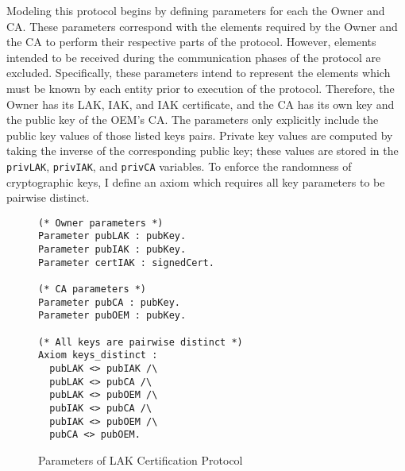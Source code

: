 Modeling this protocol begins by defining parameters for each the Owner and CA. These parameters correspond with the elements required by the Owner and the CA to perform their respective parts of the protocol. However, elements intended to be received during the communication phases of the protocol are excluded. Specifically, these parameters intend to represent the elements which must be known by each entity prior to execution of the protocol. Therefore, the Owner has its LAK, IAK, and IAK certificate, and the CA has its own key and the public key of the OEM's CA. The parameters only explicitly include the public key values of those listed keys pairs. Private key values are computed by taking the inverse of the corresponding public key; these values are stored in the \verb|privLAK|, \verb|privIAK|, and \verb|privCA| variables. To enforce the randomness of cryptographic keys, I define an axiom which requires all key parameters to be pairwise distinct. 
\begin{figure}[h]
\begin{lstlisting}[language=Coq]
(* Owner parameters *)
Parameter pubLAK : pubKey.
Parameter pubIAK : pubKey.
Parameter certIAK : signedCert.

(* CA parameters *)
Parameter pubCA : pubKey.
Parameter pubOEM : pubKey.

(* All keys are pairwise distinct *)
Axiom keys_distinct :
  pubLAK <> pubIAK /\
  pubLAK <> pubCA /\
  pubLAK <> pubOEM /\
  pubIAK <> pubCA /\
  pubIAK <> pubOEM /\
  pubCA <> pubOEM.
\end{lstlisting}
\caption{Parameters of LAK Certification Protocol}
\end{figure}

